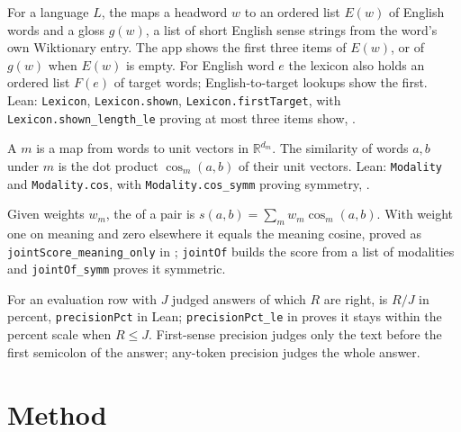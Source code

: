 \documentclass[11pt]{article}
\begin{document}
\begin{definition}[Lexicon]
\label{def:lexicon}
For a language $L$, the  maps a headword $w$ to an ordered list $E(w)$ of English words and a gloss $g(w)$, a list of short English sense strings from the word's own Wiktionary entry. The app shows the first three items of $E(w)$, or of $g(w)$ when $E(w)$ is empty. For English word $e$ the lexicon also holds an ordered list $F(e)$ of target words; English-to-target lookups show the first. Lean: \texttt{Lexicon}, \texttt{Lexicon.shown}, \texttt{Lexicon.firstTarget}, with \texttt{Lexicon.shown\_length\_le} proving at most three items show, .
\end{definition}

\begin{definition}[Modality]
\label{def:modality}
A  $m$ is a map from words to unit vectors in $\mathbb{R}^{d_m}$. The similarity of words $a,b$ under $m$ is the dot product $\cos_m(a,b)$ of their unit vectors. Lean: \texttt{Modality} and \texttt{Modality.cos}, with \texttt{Modality.cos\_symm} proving symmetry, .
\end{definition}

\begin{definition}
\label{def:joint}
Given weights $w_m$, the  of a pair is $s(a,b)=\sum_m w_m \cos_m(a,b)$. With weight one on meaning and zero elsewhere it equals the meaning cosine, proved as \texttt{jointScore\_meaning\_only} in ; \texttt{jointOf} builds the score from a list of modalities and \texttt{jointOf\_symm} proves it symmetric.
\end{definition}

\begin{definition}[Precision]
\label{def:precision}
For an evaluation row with $J$ judged answers of which $R$ are right,  is $R/J$ in percent, \texttt{precisionPct} in Lean; \texttt{precisionPct\_le} in  proves it stays within the percent scale when $R\le J$. First-sense precision judges only the text before the first semicolon of the answer; any-token precision judges the whole answer.
\end{definition}

\section{Method}
\label{sec:method}
\end{document}
